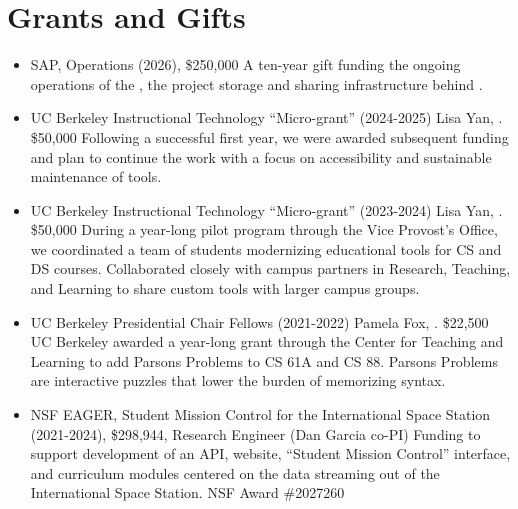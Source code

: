 \section{Grants and Gifts}
\vspace{6pt}

\begin{itemize}

  \setlength\itemsep{1em}

    \item{SAP, \snapcloud Operations (2026), \$250,000
    \newline
    A ten-year gift funding the ongoing operations of the \snapcloud, the project storage and sharing infrastructure behind \snap.
    }

    \item{UC Berkeley Instructional Technology ``Micro-grant'' (2024-2025) Lisa Yan, \firstme. \$50,000
    \newline
    Following a successful first year, we were awarded subsequent funding and plan to continue the work with a focus on accessibility and sustainable maintenance of tools.
    }
    
    \item{UC Berkeley Instructional Technology ``Micro-grant'' (2023-2024) Lisa Yan, \firstme. \$50,000
    \newline
    During a year-long pilot program through the Vice Provost's Office, we coordinated a team of students modernizing educational tools for CS and DS courses. Collaborated closely with campus partners in Research, Teaching, and Learning to share custom tools with larger campus groups.}
    
    \item{UC Berkeley Presidential Chair Fellows (2021-2022) Pamela Fox, \firstme. \$22,500
    \newline
    UC Berkeley awarded a year-long grant through the Center for Teaching and Learning to add Parsons Problems to CS 61A and CS 88. Parsons Problems are interactive puzzles that lower the burden of memorizing syntax.
    }
    
    \item{NSF EAGER, Student Mission Control for the International Space Station (2021-2024),
    \$298,944, Research Engineer (Dan Garcia co-PI)
    \newline
    Funding to support development of an API, website, ``Student Mission Control'' interface, and curriculum modules centered on the data streaming out of the International Space Station. NSF Award \#2027260}


\end{itemize}
